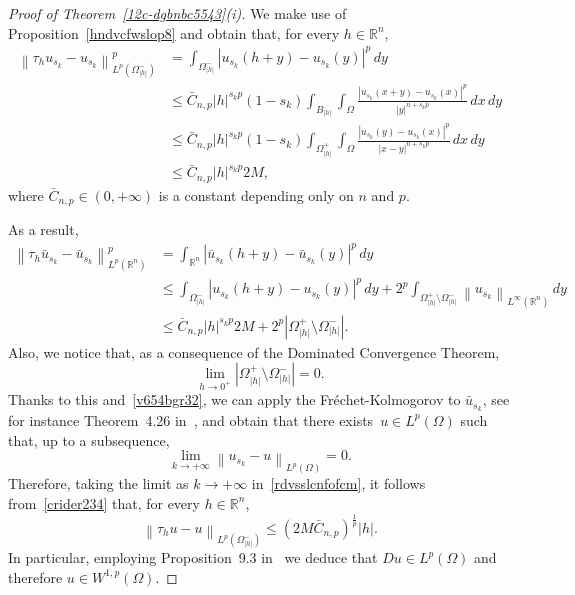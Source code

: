 \documentclass[12pt]{article}
\newcommand{\R}{\mathbb{R}}
\numberwithin{equation}{section}
\renewcommand{\leq}{\leqslant}
\begin{document}
\begin{proof}[Proof of Theorem~\ref{12c-dgbnbc5543}(i)]
We make use of Proposition~\ref{hndvcfwslop8} and obtain that, for every $h\in\R^n$,
\begin{equation}\label{rdvsslcnfofcm}
\begin{split}
\left\| \tau_h u_{s_k} -u_{s_k}   \right\|_{L^p\left(\Omega_{\left|h\right|}^-\right)}^p&=\int_{\Omega_{\left|h\right|}^{-}}\left|u_{s_k}(h+y)-u_{s_k}(y)\right|^p\,dy\\ 
&\leq  \bar{C}_{n,p}\left|h\right|^{s_k p}(1-s_k)\int_{B_{\left|h\right|}}\int_{\Omega}\frac{\left|u_{s_k}(x+y)-u_{s_k}(x)\right|^p}{\left|y\right|^{n+s_k p}}\,dx\,dy\\
&\leq \bar{C}_{n,p}\left|h\right|^{s_k p}(1-s_k)\int_{\Omega_{\left|h\right|}^+}\int_{\Omega}\frac{\left|u_{s_k}(y)-u_{s_k}(x)\right|^p}{\left|x-y\right|^{n+s_kp}}\,dx\,dy\\
&\leq \bar{C}_{n,p}\left|h\right|^{s_k p}2M,
\end{split}
\end{equation}
where $\bar{C}_{n,p}\in(0,+\infty)$ is a constant depending only on $n$ and $p$. 

As a result,
\begin{equation}\label{v654bgr32}
\begin{split}
\left\|\tau_h \bar{u}_{s_k}-\bar{u}_{s_k}\right\|_{L^p(\R^n)}^p&=\int_{\R^n}\left|\bar{u}_{s_k}(h+y)-\bar{u}_{s_k}(y)\right|^p\,dy\\
&\leq \int_{\Omega_{\left|h\right|}^{-}}\left|u_{s_k}(h+y)-u_{s_k}(y)\right|^p\,dy+2^p\int_{\Omega_{\left|h\right|}^{+}\setminus \Omega_{\left|h\right|}^{-}}\left\|u_{s_k}\right\|_{L^\infty(\R^n)}\,dy\\    
&\leq \bar{C}_{n,p}\left|h\right|^{s_k p}2M +2^p\left|\Omega_{\left|h\right|}^{+}\setminus \Omega_{\left|h\right|}^{-}\right|.
\end{split}
\end{equation}
Also, we notice that, as a consequence of the Dominated Convergence Theorem, 
\begin{equation*}
\lim_{h\to 0^+} \left|\Omega_{\left|h\right|}^{+}\setminus \Omega_{\left|h\right|}^{-}\right|=0.
\end{equation*}
Thanks to this and~\eqref{v654bgr32}, we can apply the
Fr\'echet-Kolmogorov to $\bar{u}_{s_k}$, see for instance Theorem~4.26 in~\cite{MR2759829}, and obtain that there exists~$u\in L^p(\Omega)$ such that, up to a subsequence,
\begin{equation}\label{crider234}
\lim_{k\to +\infty}\left\|u_{s_k}-u\right\|_{L^p(\Omega)}=0.
\end{equation} 
Therefore, taking the limit as $k\to +\infty$ in~\eqref{rdvsslcnfofcm}, it follows from~\eqref{crider234} that, for every $h\in\R^n$,
\begin{equation*}
\left\|\tau_h u-u\right\|_{L^p\left(\Omega_{\left|h\right|}^{-}\right)}\leq \left(2M\bar{C}_{n,p}\right)^\frac{1}{p}\left|h\right|. 
\end{equation*}
In particular, employing Proposition~9.3  in~\cite{MR2759829} we deduce that $Du\in L^p(\Omega)$ and therefore $u\in W^{1,p}(\Omega)$. 


\end{proof}
\end{document}
